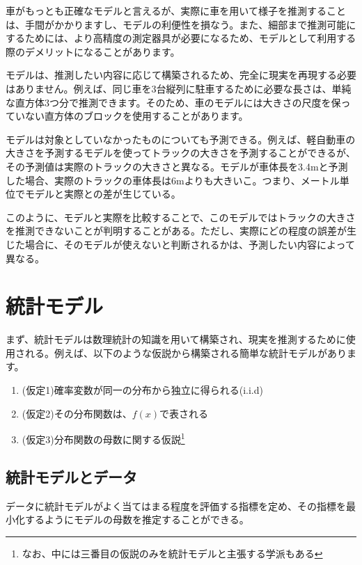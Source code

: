 車がもっとも正確なモデルと言えるが、実際に車を用いて様子を推測することは、手間がかかりますし、モデルの利便性を損なう。また、細部まで推測可能にするためには、より高精度の測定器具が必要になるため、モデルとして利用する際のデメリットになることがあります。

モデルは、推測したい内容に応じて構築されるため、完全に現実を再現する必要はありません。例えば、同じ車を3台縦列に駐車するために必要な長さは、単純な直方体3つ分で推測できます。そのため、車のモデルには大きさの尺度を保っていない直方体のブロックを使用することがあります。

モデルは対象としていなかったものについても予測できる。例えば、軽自動車の大きさを予測するモデルを使ってトラックの大きさを予測することができるが、その予測値は実際のトラックの大きさと異なる。モデルが車体長を3.4mと予測した場合、実際のトラックの車体長は6mよりも大きいこ。つまり、メートル単位でモデルと実際との差が生じている。

このように、モデルと実際を比較することで、このモデルではトラックの大きさを推測できないことが判明することがある。ただし、実際にどの程度の誤差が生じた場合に、そのモデルが使えないと判断されるかは、予測したい内容によって異なる。


\section{統計モデル}
まず、統計モデルは数理統計の知識を用いて構築され、現実を推測するために使用される。例えば、以下のような仮説から構築される簡単な統計モデルがあります。

\begin{enumerate}
 \item (仮定1)確率変数が同一の分布から独立に得られる(i.i.d)
 \item (仮定2)その分布関数は、$f(x)$で表される
 \item (仮定3)分布関数の母数に関する仮説\footnote{なお、中には三番目の仮説のみを統計モデルと主張する学派もある\cite{塩見_正衛2021}}
\end{enumerate}

\subsection{統計モデルとデータ}
データに統計モデルがよく当てはまる程度を評価する指標を定め、その指標を最小化するようにモデルの母数を推定することができる。



